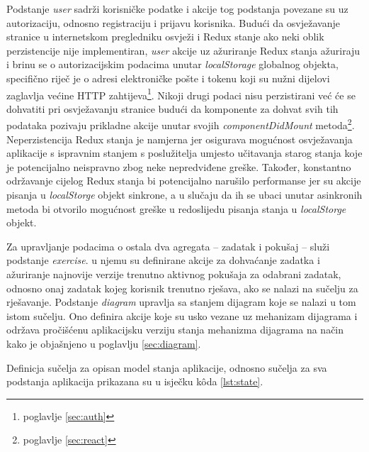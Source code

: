 \documentclass[times, utf8, diplomski, numeric]{fer}
\newcommand{\razmakp}{\vspace{18pt}}
\begin{document}
Podstanje \emph{user} sadrži korisničke podatke i akcije tog podstanja povezane su uz autorizaciju, odnosno registraciju i prijavu korisnika.
Budući da osvježavanje stranice u internetskom pregledniku osvježi i Redux stanje ako neki oblik perzistencije nije implementiran, \emph{user} akcije uz ažuriranje Redux stanja ažuriraju i brinu se o autorizacijskim podacima unutar \emph{localStorage} globalnog objekta, specifično riječ je o adresi elektroničke pošte i tokenu koji su nužni dijelovi zaglavlja većine HTTP zahtijeva\footnote{poglavlje \ref{sec:auth}}.
Nikoji drugi podaci nisu perzistirani već će se dohvatiti pri osvježavanju stranice budući da komponente za dohvat svih tih podataka pozivaju prikladne akcije unutar svojih \emph{componentDidMount} metoda\footnote{poglavlje \ref{sec:react}}.
Neperzistencija Redux stanja je namjerna jer osigurava mogućnost osvježavanja aplikacije s ispravnim stanjem s poslužitelja umjesto učitavanja starog stanja koje je potencijalno neispravno zbog neke nepredviđene greške.
Također, konstantno održavanje cijelog Redux stanja bi potencijalno narušilo performanse jer su akcije pisanja u \emph{localStorge} objekt sinkrone, a u slučaju da ih se ubaci unutar asinkronih metoda bi otvorilo mogućnost greške u redoslijedu pisanja stanja u \emph{localStorge} objekt.

Za upravljanje podacima o ostala dva agregata -- zadatak i pokušaj -- služi podstanje \emph{exercise}.
u njemu su definirane akcije za dohvaćanje zadatka i ažuriranje najnovije verzije trenutno aktivnog pokušaja za odabrani zadatak, odnosno onaj zadatak kojeg korisnik trenutno rješava, ako se nalazi na sučelju za rješavanje.
Podstanje \emph{diagram} upravlja sa stanjem dijagram koje se nalazi u tom istom sučelju.
Ono definira akcije koje su usko vezane uz mehanizam dijagrama i održava pročišćenu aplikacijsku verziju stanja mehanizma dijagrama na način kako je objašnjeno u poglavlju \ref{sec:diagram}.

\razmakp

Definicja sučelja za opisan model stanja aplikacije, odnosno sučelja za sva podstanja aplikacija prikazana su u isječku kôda \ref{lst:state}.
\end{document}
